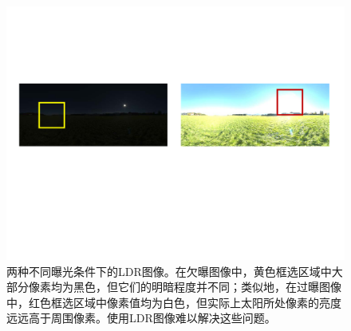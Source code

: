 \begin{figure}[H]
    \centering
    \includegraphics[width=1.0\textwidth]{Img/different-exposure.pdf}
    \caption[使用不同曝光拍摄的LDR图像]
    {两种不同曝光条件下的LDR图像。在欠曝图像中，黄色框选区域中大部分像素均为黑色，但它们的明暗程度并不同；类似地，在过曝图像中，红色框选区域中像素值均为白色，但实际上太阳所处像素的亮度远远高于周围像素。使用LDR图像难以解决这些问题。}
    \label{fig:different-exposure}
\end{figure}